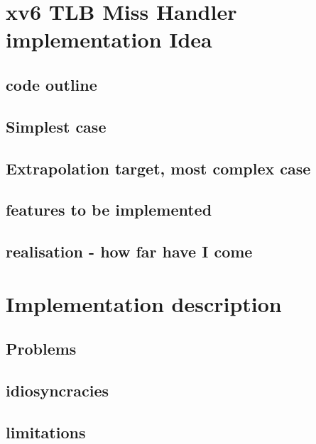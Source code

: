 \section{xv6 TLB Miss Handler implementation Idea}
\subsection{code outline}
\subsection{Simplest case}
\subsection{Extrapolation target, most complex case}
\subsection{features to be implemented}
\subsection{realisation - how far have I come}

\section{Implementation description}
\subsection{Problems}
\subsection{idiosyncracies}
\subsection{limitations}